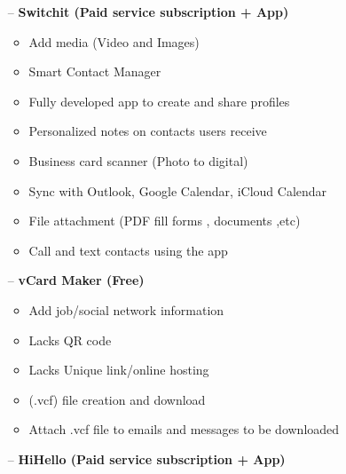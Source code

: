 \documentclass[12pt]{article}%
\begin{document}
\begin{enumerate}
\begin{enumerate}
\begin{enumerate}
                \item [--] \textbf{Switchit (Paid service subscription + App)}
                
                \begin{itemize}
                    \item Add media (Video and Images)
                    \item Smart Contact Manager
                    \item Fully developed app to create and share profiles
                    \item Personalized notes on contacts users receive
                    \item Business card scanner (Photo to digital)
                    \item Sync with Outlook, Google Calendar, iCloud Calendar
                    \item File attachment (PDF fill forms , documents ,etc)
                    \item Call and text contacts using the app
                \end{itemize}
                
                \item [--] \textbf{vCard Maker (Free)}
                \begin{itemize}
                    \item Add job/social network information
                    \item Lacks QR code
                    \item Lacks Unique link/online hosting
                    \item (.vcf) file creation and download
                    \item Attach .vcf file to emails and messages to be downloaded
                \end{itemize}
                
                \item [--] \textbf{HiHello (Paid service subscription + App)}
                

\end{enumerate}
\end{enumerate}
\end{enumerate}
\end{document}
